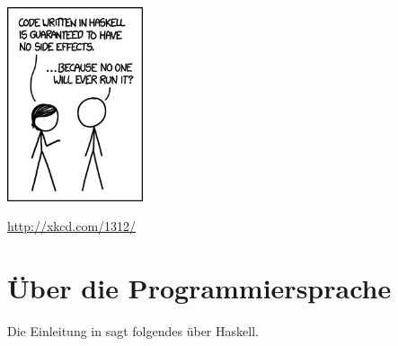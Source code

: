 \begin{center}
\includegraphics[width=0.3\textwidth]{haskell-1312.png}
\end{center}
\begin{center}
\url{http://xkcd.com/1312/}
\end{center}

\section{Über die Programmiersprache}
Die Einleitung in \cite{lyahfgg} sagt folgendes über Haskell.

